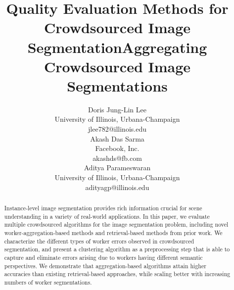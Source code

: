 \documentclass[letterpaper]{article}
\title{Quality Evaluation Methods for Crowdsourced Image Segmentation}
\begin{document}
           \title{Aggregating Crowdsourced Image Segmentations}
            \author{%
              Doris Jung-Lin Lee\\
              University of Illinois, Urbana-Champaign\\
              jlee782@illinois.edu\\
            \And
              Akash Das Sarma\\
              Facebook, Inc.\\
              akashds@fb.com\\
            \And 
              Aditya Parameswaran\\
              University of Illinois, Urbana-Champaign\\
              adityagp@illinois.edu\\
            }
           \maketitle
           \begin{abstract}
           Instance-level image segmentation provides rich information crucial for scene understanding in a variety of real-world applications. In this paper, we evaluate multiple crowdsourced algorithms for the image segmentation problem, including novel worker-aggregation-based methods and retrieval-based methods from prior work. We characterize the different types of worker errors observed in crowdsourced segmentation, and present a clustering algorithm as a preprocessing step that is able to capture and eliminate errors arising due to workers having different semantic perspectives. We demonstrate that aggregation-based algorithms attain higher accuracies than existing retrieval-based approaches, while scaling better with increasing numbers of worker segmentations. 
          \end{abstract}

\end{document}
